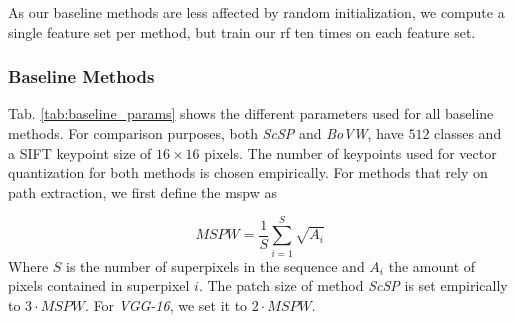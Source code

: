 As our baseline methods are less affected by random initialization, we compute a single feature set per method,
but train our \gls{rf} ten times on each feature set.

\subsubsection{Baseline Methods}
Tab. \ref{tab:baseline_params} shows the different parameters used for all baseline methods.
For comparison purposes, both \textit{ScSP} and \textit{BoVW}, have $512$ classes and a SIFT keypoint size of $16 \times 16$ pixels.
The number of keypoints used for vector quantization for both methods is chosen empirically.
For methods that rely on path extraction, we first define the \gls{mspw} as

\begin{equation}
   MSPW = \frac{1}{S} \sum_{i=1}^S \sqrt{A_i}
   \label{eq:mspw}
\end{equation}
\vspace{6pt}
Where $S$ is the number of superpixels in the sequence and $A_{i}$ the amount of pixels contained in superpixel $i$.
The patch size of method \textit{ScSP} is set empirically to $3 \cdot MSPW$.
For \textit{VGG-16}, we set it to $2 \cdot MSPW$.

